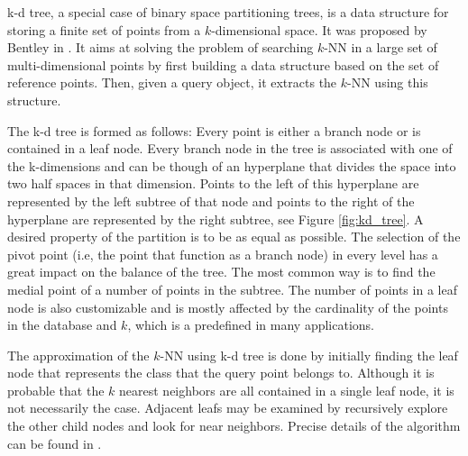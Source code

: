 \documentclass[10pt, conference, compsocconf]{IEEEtran}
\theoremstyle{definition}
\begin{document}
k-d tree, a special case of binary space partitioning trees, is a data structure for storing a finite set of points from a $k$-dimensional space. It was proposed by Bentley in \cite{bentley1975multidimensional}. 
It aims at solving the problem of searching $k$-NN in a large set of multi-dimensional points by first building a data structure based on the set of reference points. Then, given a query object, it extracts the $k$-NN using this structure.

\iftoggle{edit-mode}{\hspace{0pt}\marginpar{How it works, how the data is saved and extracted}}{} 
The k-d tree is formed as follows: Every point is either a branch node or is contained in a leaf node. 
Every branch node in the tree is associated with one of the k-dimensions and can be though of an hyperplane that divides the space into two half spaces in that dimension. Points to the left of this hyperplane are represented by the left subtree of that node and points to the right of the hyperplane are represented by the right subtree, see Figure \ref{fig:kd_tree}. A desired property of the partition is to be as equal as possible. The selection of the pivot point (i.e,  the point that function as a branch node) in every level has a great impact on the balance of the tree. The most common way is to find the medial point of a number of points in the subtree. The number of points in a leaf node is also customizable and is mostly affected by the cardinality of the points in the database and $k$, which is a predefined in many applications.



\iftoggle{edit-mode}{\hspace{0pt}\marginpar{How the NN are found?}}{}
The approximation of the $k$-NN using k-d tree is done by initially finding the leaf node that represents the class that the query point belongs to. Although it is probable that the $k$ nearest neighbors are all contained in a single leaf node, it is not necessarily the case. Adjacent leafs may be examined by recursively explore the other child nodes and look for near neighbors. Precise details of the algorithm can be found in \cite{bentley1975multidimensional}.
 
\end{document}
